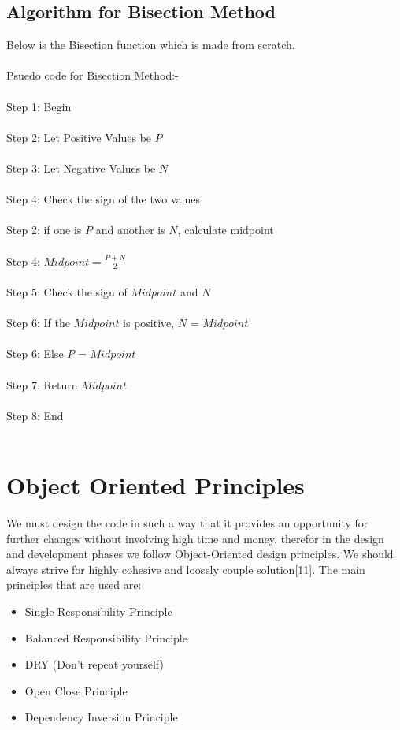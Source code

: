 \documentclass[11pt]{article}
\begin{document}
	\subsection{Algorithm for Bisection Method}
		Below is the Bisection function which is made from scratch.\\\\
		Psuedo code for Bisection Method:-\\\\
		Step 1: Begin\\\\
		Step 2:	Let Positive Values be $P$\\\\
		Step 3: Let Negative Values be $N$\\\\
		Step 4: Check the sign of the two values\\\\
		Step 2: if one is $P$ and another is $N$, calculate midpoint\\\\
		Step 4: $Midpoint=\frac{P+N}{2}$\\\\
		Step 5: Check the sign of $Midpoint$ and $N$ \\\\
		Step 6: If the $Midpoint$ is positive, $N$ = $Midpoint$\\\\
		Step 6: Else $P$ = $Midpoint$\\\\
		Step 7: Return $Midpoint$\\\\
		Step 8: End\\\\		
		
\newpage
\section{Object Oriented Principles}

		We must design the code in such a way that it provides an opportunity for further changes without involving high time and money. therefor in the design and development phases we follow Object-Oriented design principles. We should always strive for highly cohesive and loosely couple solution[11]. The main principles that are used are: 

	\begin{itemize}
		\item Single Responsibility Principle
		\item Balanced Responsibility Principle
		\item DRY (Don't repeat yourself)
		\item Open Close Principle
		\item Dependency Inversion Principle
	\end{itemize} 
\end{document}

